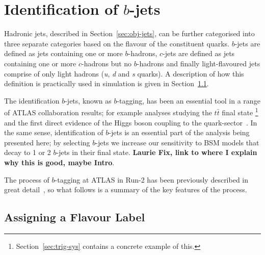\section{Identification of $b$-jets}
\label{sec:obj-bjets}

Hadronic jets, described in Section~\ref{sec:obj-jets}, can be further categorised into three separate categories based on the flavour of the constituent quarks.
$b$-jets are defined as jets containing one or more $b$-hadrons,
$c$-jets are defined as jets containing one or more $c$-hadrons but no $b$-hadrons
and finally light-flavoured jets comprise of only light hadrons (\textit{u}, \textit{d} and \textit{s} quarks).
A description of how this definition is practically used in simulation is given in Section~\ref{sec:obj-bjet_label}.

The identification $b$-jets, known as $b$-tagging, has been an essential tool in a range of ATLAS collaboration results;
for example analyses studying the $t\bar{t}$ final state \cite{obj-ttbar} \footnote{Section~\ref{sec:trig-sys} contains a concrete example of this.}
and the first direct evidence of the Higgs boson coupling to the quark-sector~\cite{obj-Hbb}.
In the same sense, identification of $b$-jets is an essential part of the analysis being presented here;
by selecting $b$-jets we increase our sensitivity to BSM models that decay to 1 or 2 $b$-jets in their final state.
\textbf{Laurie Fix, link to where I explain why this is good, maybe Intro}.

The process of $b$-tagging at ATLAS in Run-2 has been previously described in great
detail~\cite{obj-bjet_algo_2015,obj-bjet_algo_2016},
so what follows is a summary of the key features of the process.

\subsection{Assigning a Flavour Label}
\label{sec:obj-bjet_label}


